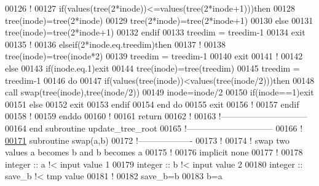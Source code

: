 \begin{DoxyCode}
00126           \textcolor{comment}{!}
00127           \textcolor{keyword}{if}(values(tree(2*inode))<=values(tree(2*inode+1)))\textcolor{keyword}{then}
00128              tree(inode)=tree(2*inode)
00129              tree(2*inode)=tree(2*inode+1)
00130           \textcolor{keyword}{else}
00131              tree(inode)=tree(2*inode+1)
00132           \textcolor{keyword}{endif}
00133           treedim = treedim-1
00134           exit
00135           \textcolor{comment}{!}
00136        elseif(2*inode.eq.treedim)\textcolor{keyword}{then}
00137           \textcolor{comment}{!}
00138           tree(inode)=tree(inode*2)
00139           treedim = treedim-1
00140           exit
00141           \textcolor{comment}{!}
00142        \textcolor{keyword}{else}
00143           \textcolor{keyword}{if}(inode.eq.1)exit
00144           tree(inode)=tree(treedim)
00145           treedim = treedim-1
00146           \textcolor{keyword}{do}
00147              \textcolor{keyword}{if}(values(tree(inode))<values(tree(inode/2)))\textcolor{keyword}{then}
00148                 call swap(tree(inode),tree(inode/2))
00149                 inode=inode/2
00150                 \textcolor{keyword}{if}(inode==1)exit
00151              \textcolor{keyword}{else}
00152                 exit
00153              \textcolor{keyword}{endif}
00154           \textcolor{keyword}{end do}
00155           exit
00156           \textcolor{comment}{!}
00157        \textcolor{keyword}{endif}
00158        \textcolor{comment}{!}
00159     \textcolor{keyword}{enddo}
00160     \textcolor{comment}{!}
00161     return
00162     \textcolor{comment}{!}
00163   \textcolor{comment}{!------------------------------}
00164 \textcolor{keyword}{  end subroutine update\_tree\_root}
00165   \textcolor{comment}{!------------------------------}
00166   \textcolor{comment}{!}
\hypertarget{module__binary__tree_8f90_source_l00171}{}\hyperlink{classmodule__binary__tree_a038c2b54735ff5c76847e780403880a6}{00171}   \textcolor{keyword}{subroutine }swap(a,b)
00172   \textcolor{comment}{!-------------------}
00173     \textcolor{comment}{!}
00174     \textcolor{comment}{! swap two values a becomes b and b becomes a}
00175     \textcolor{comment}{!}
00176     \textcolor{keyword}{implicit none}
00177     \textcolor{comment}{!}
00178     \textcolor{keywordtype}{integer} :: a \textcolor{comment}{!< input value 1}
00179     \textcolor{keywordtype}{integer} :: b \textcolor{comment}{!< input value 2}
00180     \textcolor{keywordtype}{integer} :: save\_b \textcolor{comment}{!< tmp value}
00181     \textcolor{comment}{!}
00182     save\_b=b
00183     b=a

\end{DoxyCode}
